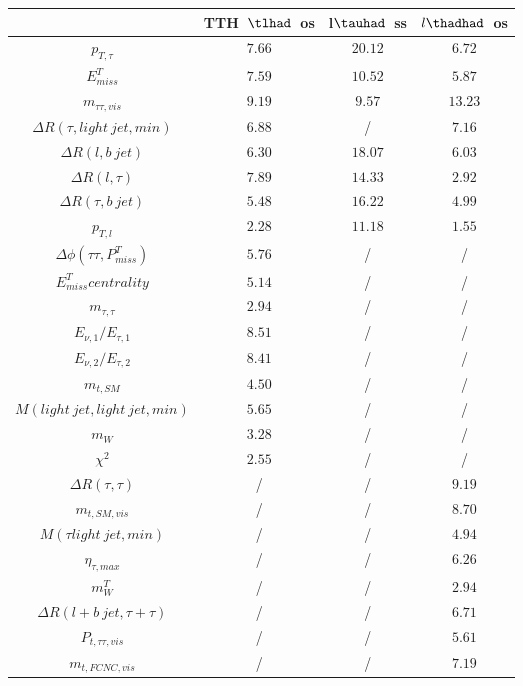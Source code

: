 \begin{tabular}{|c|c|c|c|} \hline
 & TTH~$\tlhad$~os & l$\tauhad$~ss & $l\thadhad$~os\\\hline
$p_{T,\tau }$ & $7.66$ & $20.12$ & $6.72$\\\hline
$E^{T}_{miss}$ & $7.59$ & $10.52$ & $5.87$\\\hline
$m_{\tau \tau ,vis}$ & $9.19$ & $9.57$ & $13.23$\\\hline
$\Delta R(\tau ,light~jet,min)$ & $6.88$ &  / & $7.16$\\\hline
$\Delta R(l,b~jet)$ & $6.30$ & $18.07$ & $6.03$\\\hline
$\Delta R(l,\tau )$ & $7.89$ & $14.33$ & $2.92$\\\hline
$\Delta R(\tau ,b~jet)$ & $5.48$ & $16.22$ & $4.99$\\\hline
$p_{T,l}$ & $2.28$ & $11.18$ & $1.55$\\\hline
$\Delta\phi(\tau \tau ,P^{T}_{miss})$ & $5.76$ &  / &  /\\\hline
$E^{T}_{miss} centrality$ & $5.14$ &  / &  /\\\hline
$m_{\tau ,\tau }$ & $2.94$ &  / &  /\\\hline
$E_{\nu,1}/E_{\tau ,1}$ & $8.51$ &  / &  /\\\hline
$E_{\nu,2}/E_{\tau ,2}$ & $8.41$ &  / &  /\\\hline
$m_{t,SM}$ & $4.50$ &  / &  /\\\hline
$M(light~jet,light~jet,min)$ & $5.65$ &  / &  /\\\hline
$m_{W}$ & $3.28$ &  / &  /\\\hline
$\chi^{2}$ & $2.55$ &  / &  /\\\hline
$\Delta R(\tau ,\tau )$ &  / &  / & $9.19$\\\hline
$m_{t,SM,vis}$ &  / &  / & $8.70$\\\hline
$M(\tau  light~jet,min)$ &  / &  / & $4.94$\\\hline
$\eta_{\tau ,max}$ &  / &  / & $6.26$\\\hline
$m^{T}_{W}$ &  / &  / & $2.94$\\\hline
$\Delta R(l+b~jet,\tau +\tau )$ &  / &  / & $6.71$\\\hline
$P_{t,\tau \tau ,vis}$ &  / &  / & $5.61$\\\hline
$m_{t,FCNC,vis}$ &  / &  / & $7.19$\\\hline
\end{tabular}

